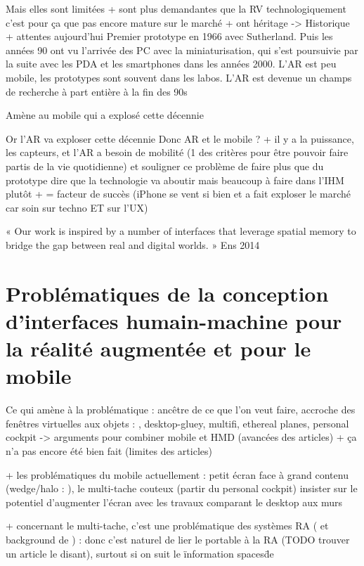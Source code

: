 Mais elles sont limitées + sont plus demandantes que la RV technologiquement c'est pour ça que pas encore mature sur le marché + ont héritage -> Historique + attentes aujourd'hui
Premier prototype en 1966 avec Sutherland. Puis les années 90 ont vu l'arrivée des PC avec la miniaturisation, qui s'est poursuivie par la suite avec les PDA et les smartphones dans les années 2000. L'AR est peu mobile, les prototypes sont souvent dans les labos. L'AR est devenue un champs de recherche à part entière à la fin des 90s

Amène au mobile qui a explosé cette décennie

Or l'AR va exploser cette décennie
Donc AR et le mobile ? + il y a la puissance, les capteurs, et l'AR a besoin de mobilité (1 des critères pour être pouvoir faire partis de la vie quotidienne) \citep{VanKrevelenPoelman2010} et souligner ce problème de faire plus que du prototype \cite{HuangHuiPeyloEtAl2013}
dire que la technologie va aboutir mais beaucoup à faire dans l'IHM plutôt + = facteur de succès (iPhone se vent si bien et a fait exploser le marché car soin sur techno ET sur l'UX)

« Our work is inspired by a number of interfaces that leverage
spatial memory to bridge the gap between real and digital
worlds. » Ens 2014


\section*{Problématiques de la conception d'interfaces humain-machine pour la réalité augmentée et pour le mobile}
Ce qui amène à la problématique : ancêtre de ce que l'on veut faire, accroche des fenêtres virtuelles aux objets : \cite{FeinerMacIntyreHauptEtAl1993}, desktop-gluey, multifi, ethereal planes, personal cockpit -> arguments pour combiner mobile et HMD (avancées des articles) + ça n'a pas encore été bien fait (limites des articles)

+ les problématiques du mobile actuellement : petit écran face à grand contenu (wedge/halo : \cite{BaudischRosenholtz2003} \cite{GustafsonBaudischGutwinEtAl2008} \cite{BurigatChittaro2011}), le multi-tache couteux (partir du personal cockpit)
insister sur le potentiel d'augmenter l'écran avec les travaux comparant le desktop aux murs \cite{LiuChapuisBeaudouin-LafonEtAl2014} \cite{ShuppBallYostEtAl2006}

+ concernant le multi-tache, c'est une problématique des systèmes RA (\cite{SchmalstiegFuhrmannHesinaEtAl2002} et background de \cite{EnsFinneganIrani2014}) : donc c'est naturel de lier le portable à la RA (TODO trouver un article le disant), surtout si on suit le \"information spaces\" de \cite{EnsHincapie-RamosIrani2014}
\cite{TanCzerwinski2003}


